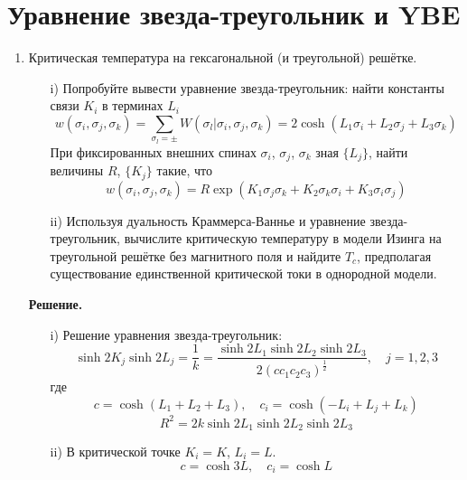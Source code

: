 \documentclass[12pt]{article}
\theoremstyle{definition}
\begin{document}
\section{Уравнение звезда-треугольник и YBE}
\begin{enumerate}
    \item Критическая температура на гексагональной (и треугольной) решётке.
    \begin{itemize}
        \item[i)] Попробуйте вывести уравнение звезда-треугольник: найти константы связи $K_i$ в терминах $L_i$
        \begin{equation}
            w(\sigma_i,\sigma_j,\sigma_k)=\sum\limits_{\sigma_l=\pm}W(\sigma_l|\sigma_i,\sigma_j,\sigma_k)=2\cosh(L_1\sigma_i+L_2\sigma_j+L_3\sigma_k)
        \end{equation}
        При фиксированных внешних спинах $\sigma_i$, $\sigma_j$, $\sigma_k$ зная $\{L_j\}$, найти величины $R$, $\{K_j\}$ такие, что
        \begin{equation}
            w(\sigma_i,\sigma_j,\sigma_k)=R\exp(K_1\sigma_j\sigma_k+K_2\sigma_k\sigma_i+K_3\sigma_i\sigma_j)
        \end{equation}
        \item[ii)] Используя дуальность Краммерса-Ваннье и уравнение звезда-треугольник, вычислите критическую температуру в модели Изинга на треугольной решётке без магнитного поля и найдите $T_c$, предполагая существование единственной критической токи в однородной модели.
    \end{itemize}
    \textbf{Решение.}
    \begin{itemize}
        \item[i)] Решение уравнения звезда-треугольник:
        \begin{equation}
            \sinh2K_j\sinh2L_j=\frac{1}{k}=\frac{\sinh2L_1\sinh2L_2\sinh2L_3}{2(cc_1c_2c_3)^\frac{1}{2}},\quad j=1,2,3
        \end{equation}
        где
        \begin{equation}
            c=\cosh(L_1+L_2+L_3),\quad c_i=\cosh(-L_i+L_j+L_k)
        \end{equation}
        \begin{equation}
            R^2=2k\sinh2L_1\sinh2L_2\sinh2L_3
        \end{equation}
        \item[ii)] В критической точке $K_i=K$, $L_i=L$.
        \begin{equation}
            c=\cosh3L,\quad c_i=\cosh L

\end{equation}
\end{itemize}
\end{enumerate}
\end{document}

